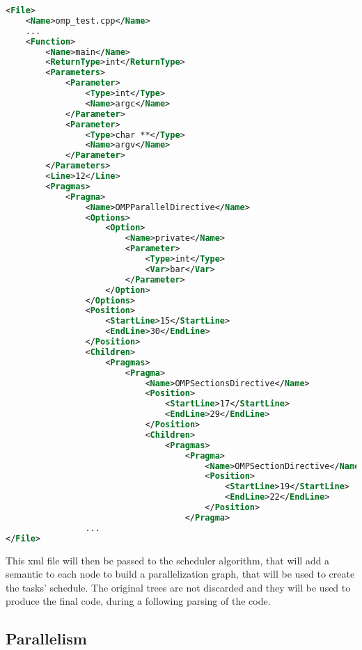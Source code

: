 \documentclass[a4paper,11pt,oneside]{book}
\begin{document}
\begin{lstlisting}[language=XML, caption=XML file of the pragma structure of Code~\ref{code}., label=xmlpragma]
<File>
    <Name>omp_test.cpp</Name>    
    ...
    <Function>
        <Name>main</Name>
        <ReturnType>int</ReturnType>
        <Parameters>
            <Parameter>
                <Type>int</Type>
                <Name>argc</Name>
            </Parameter>
            <Parameter>
                <Type>char **</Type>
                <Name>argv</Name>
            </Parameter>
        </Parameters>
        <Line>12</Line>
        <Pragmas>
            <Pragma>
                <Name>OMPParallelDirective</Name>
                <Options>
                    <Option>
                        <Name>private</Name>
                        <Parameter>
                            <Type>int</Type>
                            <Var>bar</Var>
                        </Parameter>
                    </Option>
                </Options>
                <Position>
                    <StartLine>15</StartLine>
                    <EndLine>30</EndLine>
                </Position>
                <Children>
                    <Pragmas>
                        <Pragma>
                            <Name>OMPSectionsDirective</Name>
                            <Position>
                                <StartLine>17</StartLine>
                                <EndLine>29</EndLine>
                            </Position>
                            <Children>
                                <Pragmas>
                                    <Pragma>
                                        <Name>OMPSectionDirective</Name>
                                        <Position>
                                            <StartLine>19</StartLine>
                                            <EndLine>22</EndLine>
                                        </Position>
                                    </Pragma>
				...
</File>
\end{lstlisting}
This xml file will then be passed to the scheduler algorithm, that will add a semantic to each node to build a parallelization graph, that will be used to create the tasks’ schedule. The original trees are not discarded and they will be used to produce the final code, during a following parsing of the code.




\subsection{Parallelism}
\end{document}

